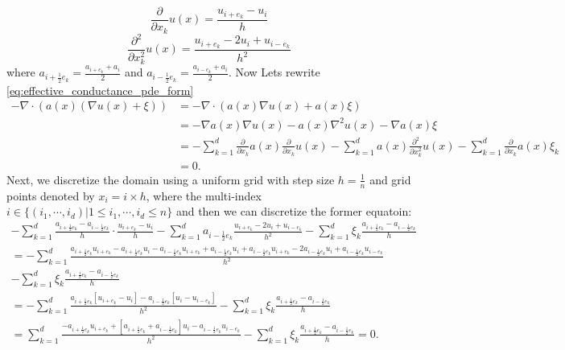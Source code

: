 \begin{equation}
	\frac{\partial}{\partial x_k} u(x) = \frac{u_{i+e_{k}} - u_{i}}{h}
\end{equation}
\begin{equation}
	\frac{\partial^2}{\partial x_k^2} u(x) = \frac{u_{i+e_{k}} - 2 u_{i} + u_{i-e_{k}}}{h^2}
\end{equation}
where $a_{i+\frac{1}{2}e_{k}} = \frac{a_{i+e_{k}} + a_{i}}{2}$ and $a_{i-\frac{1}{2}e_{k}} = \frac{a_{i-e_{k}} + a_{i}}{2}$. Now Lets rewrite \eqref{eq:effective_conductance_pde_form} 
\begin{align*}
	-\nabla\cdot (a(x)(\nabla u(x)+\xi)) &= -\nabla\cdot (a(x)\nabla u(x) + a(x) \xi) \\ &= -\nabla a(x) \nabla u(x) - a(x) \nabla^2 u(x) - \nabla a(x)\xi \\ &= - \sum_{k=1}^{d} \frac{\partial}{\partial x_k} a(x) \frac{\partial}{\partial x_k} u(x) - \sum_{k=1}^{d} a(x) \frac{\partial^2}{\partial x_k^2} u(x) - \sum_{k=1}^{d} \frac{\partial}{\partial x_k} a(x) \xi_k \\ & =0.
\end{align*}
Next, we discretize the domain using a uniform grid with step size $h=\frac{1}{n}$ and grid points denoted by $x_i = i \times h$, where the multi-index $i\in\{(i_1,\cdots,i_d)| 1\leq i_1,\cdots,i_d\leq n\}$ and then we can discretize the former equatoin:
\begin{multline*}
	-\sum_{k=1}^{d} \frac{a_{i+\frac{1}{2}e_{k}} - a_{i-\frac{1}{2}e_{k}}}{h} \cdot \frac{u_{i+e_{k}} - u_{i}}{h} - \sum_{k=1}^{d} a_{i-\frac{1}{2} e_k}  \frac{u_{i+e_{k}} - 2 u_{i} + u_{i-e_{k}}}{h^2} - \sum_{k=1}^{d} \xi_k \frac{a_{i+\frac{1}{2}e_{k}} - a_{i-\frac{1}{2}e_{k}}}{h} \\
	= - \sum_{k=1}^{d} \frac{ a_{i+\frac{1}{2}e_{k}} u_{i+e_k} - a_{i+\frac{1}{2}e_{k}} u_i - a_{i-\frac{1}{2}e_{k}} u_{i+e_k} + a_{i-\frac{1}{2}e_{k}} u_i + a_{i-\frac{1}{2}e_{k}} u_{i+e_k} - 2 a_{i-\frac{1}{2}e_{k}} u_i + a_{i-\frac{1}{2}e_{k}} u_{i-e_k}}{h^2} \\ - \sum_{k=1}^{d} \xi_k \frac{a_{i+\frac{1}{2}e_{k}} - a_{i-\frac{1}{2}e_{k}}}{h} \\
	= - \sum_{k=1}^{d} \frac{ a_{i+\frac{1}{2}e_{k}} [u_{i+e_k} - u_i] -  a_{i-\frac{1}{2}e_{k}} [u_i - u_{i-e_k}]}{h^2} - \sum_{k=1}^{d} \xi_k \frac{a_{i+\frac{1}{2}e_{k}} - a_{i-\frac{1}{2}e_{k}}}{h}  \\
	= \sum_{k=1}^{d} \frac{- a_{i+\frac{1}{2}e_{k}} u_{i+e_k} + [a_{i+\frac{1}{2}e_{k}} + a_{i-\frac{1}{2}e_{k}}] u_i - a_{i-\frac{1}{2}e_{k}} u_{i-e_k}}{h^2} - \sum_{k=1}^{d} \xi_k \frac{a_{i+\frac{1}{2}e_{k}} - a_{i-\frac{1}{2}e_{k}}}{h} = 0.
\end{multline*}

